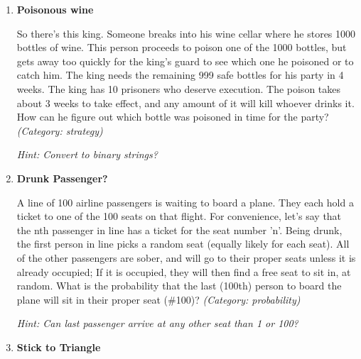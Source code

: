 \begin{enumerate}




\item \textbf{Poisonous wine}

So there's this king. Someone breaks into his wine cellar where he stores 1000 bottles of wine. This person proceeds to poison one of the 1000 bottles, but gets away too quickly for the king's guard to see which one he poisoned or to catch him.
The king needs the remaining 999 safe bottles for his party in 4 weeks. The king has 10 prisoners who deserve execution. The poison takes about 3 weeks to take effect, and any amount of it will kill whoever drinks it. How can he figure out which bottle was poisoned in time for the party?
\small\emph{(Category: strategy)}

\small\emph{Hint: Convert to binary strings?}





\item \textbf{Drunk Passenger?}

A line of 100 airline passengers is waiting to board a plane. They each hold a ticket to one of the 100 seats on that flight. For convenience, let's say that the nth passenger in line has a ticket for the seat number 'n'. Being drunk, the first person in line picks a random seat (equally likely for each seat). All of the other passengers are sober, and will go to their proper seats unless it is already occupied; If it is occupied, they will then find a free seat to sit in, at random.
What is the probability that the last (100th) person to board the plane will sit in their proper seat (\#100)?
\small\emph{(Category: probability)}

\small\emph{Hint: Can last passenger arrive at any other seat than 1 or 100?}





\item \textbf{Stick to Triangle}


\end{enumerate}
